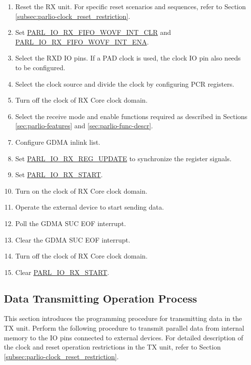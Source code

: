 \documentclass[main\_\_EN.tex]{subfiles}
\begin{document}
\begin{enumerate}
    \item Reset the RX unit. For specific reset scenarios and sequences, refer to Section \ref{subsec:parlio-clock_reset_restriction}.
    \item Set \hyperref[fielddesc:PARLIORXFIFOWOVFINTCLR]{PARL\_IO\_RX\_FIFO\_WOVF\_INT\_CLR} and \hyperref[fielddesc:PARLIORXFIFOWOVFINTENA]{PARL\_IO\_RX\_FIFO\_WOVF\_INT\_ENA}.
    \item Select the RXD IO pins. If a PAD clock is used, the clock IO pin also needs to be configured. 
    \item Select the clock source and divide the clock by configuring PCR registers.
    \item Turn off the clock of RX Core clock domain.
    \item Select the receive mode and enable functions required as described in Sections \ref{sec:parlio-features} and \ref{sec:parlio-func-descr}.
    \item Configure GDMA inlink list.
    \item Set \hyperref[fielddesc:PARLIORXREGUPDATE]{PARL\_IO\_RX\_REG\_UPDATE} to synchronize the register signals.
    \item Set \hyperref[fielddesc:PARLIORXSTART]{PARL\_IO\_RX\_START}.
    \item Turn on the clock of RX Core clock domain.
    \item Operate the external device to start sending data.
    \item Poll the GDMA SUC EOF interrupt.
    \item Clear the GDMA SUC EOF interrupt.
    \item Turn off the clock of RX Core clock domain.
    \item Clear \hyperref[fielddesc:PARLIORXSTART]{PARL\_IO\_RX\_START}.
\end{enumerate}

\subsection{Data Transmitting Operation Process}

This section introduces the programming procedure for transmitting data in the TX unit. Perform the following procedure to transmit parallel data from internal memory to the IO pins connected to external devices. For detailed description of the clock and reset operation restrictions in the TX unit, refer to Section \ref{subsec:parlio-clock_reset_restriction}.
\end{document}
